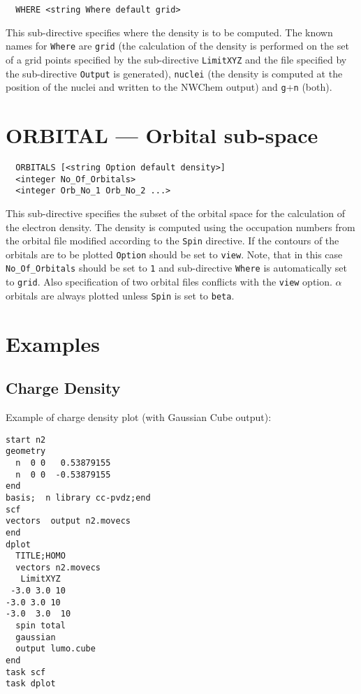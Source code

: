 \begin{verbatim}
  WHERE <string Where default grid>
\end{verbatim}

This sub-directive specifies where the density is to be computed.
The known names for \verb+Where+ are \verb+grid+ (the calculation of
the density is performed on the set of a grid points specified by the
sub-directive \verb+LimitXYZ+ and the file specified by the sub-directive
\verb+Output+ is generated), \verb+nuclei+ (the density is computed at
the position of the nuclei and written to the NWChem output) and
\verb+g++\verb+n+ (both).


\section{ORBITAL --- Orbital sub-space}

\begin{verbatim}
  ORBITALS [<string Option default density>]
  <integer No_Of_Orbitals>
  <integer Orb_No_1 Orb_No_2 ...>
\end{verbatim}

This sub-directive specifies the subset of the orbital space for the
calculation of the electron density. The density is computed using the
occupation numbers from the orbital file modified according to the
\verb+Spin+ directive. If the contours of the orbitals are to be plotted
\verb+Option+ should be set to \verb+view+. Note, that in this case
\verb+No_Of_Orbitals+ should be set to \verb+1+ and sub-directive
\verb+Where+ is automatically set to \verb+grid+. Also specification
of two orbital files conflicts with the \verb+view+ option.
$\alpha$ orbitals are always plotted unless \verb+Spin+ is set to
\verb+beta+.

\section{Examples}

\subsection*{Charge Density}

Example of charge density plot (with Gaussian Cube output):
\begin{verbatim}
start n2
geometry
  n  0 0   0.53879155
  n  0 0  -0.53879155
end
basis;  n library cc-pvdz;end
scf
vectors  output n2.movecs
end
dplot
  TITLE;HOMO
  vectors n2.movecs
   LimitXYZ
 -3.0 3.0 10  
-3.0 3.0 10 
-3.0  3.0  10
  spin total
  gaussian
  output lumo.cube
end
task scf     
task dplot
\end{verbatim}

